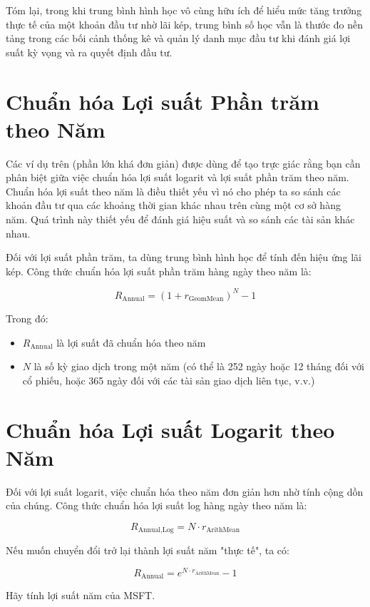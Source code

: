 Tóm lại, trong khi trung bình hình học vô cùng hữu ích để hiểu mức tăng trưởng thực tế của một khoản đầu tư nhờ lãi kép, trung bình số học vẫn là thước đo nền tảng trong các bối cảnh thống kê và quản lý danh mục đầu tư khi đánh giá lợi suất kỳ vọng và ra quyết định đầu tư.

\section{Chuẩn hóa Lợi suất Phần trăm theo Năm}

Các ví dụ trên (phần lớn khá đơn giản) được dùng để tạo trực giác rằng bạn cần phân biệt giữa việc chuẩn hóa lợi suất logarit và lợi suất phần trăm theo năm. Chuẩn hóa lợi suất theo năm là điều thiết yếu vì nó cho phép ta so sánh các khoản đầu tư qua các khoảng thời gian khác nhau trên cùng một cơ sở hàng năm. Quá trình này thiết yếu để đánh giá hiệu suất và so sánh các tài sản khác nhau.

Đối với lợi suất phần trăm, ta dùng trung bình hình học để tính đến hiệu ứng lãi kép. Công thức chuẩn hóa lợi suất phần trăm hàng ngày theo năm là:

$$
R_{\text{Annual}} = (1 + r_{\text{GeomMean}})^N - 1
$$

Trong đó:

\begin{itemize}
  \item $R_{\text{Annual}}$ là lợi suất đã chuẩn hóa theo năm
  \item $N$ là số kỳ giao dịch trong một năm (có thể là 252 ngày hoặc 12 tháng đối với cổ phiếu, hoặc 365 ngày đối với các tài sản giao dịch liên tục, v.v.)
\end{itemize}

\section{Chuẩn hóa Lợi suất Logarit theo Năm}

Đối với lợi suất logarit, việc chuẩn hóa theo năm đơn giản hơn nhờ tính cộng dồn của chúng. Công thức chuẩn hóa lợi suất log hàng ngày theo năm là:

$$
R_{\text{Annual,Log}} = N \cdot r_{\text{ArithMean}}
$$

Nếu muốn chuyển đổi trở lại thành lợi suất năm "thực tế", ta có:

$$
R_{\text{Annual}} = e^{N \cdot r_{\text{ArithMean}}} - 1
$$

Hãy tính lợi suất năm của MSFT.

